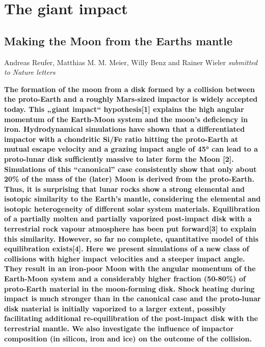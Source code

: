 \chapter{The giant impact}
\label{ch05}
\graphicspath{{./05figs/}}


\section{Making the Moon from the Earths mantle}




Andreas Reufer, Matthias M. M. Meier, Willy Benz and Rainer Wieler
\emph{submitted to Nature letters}

\textbf{The formation of the moon from a disk formed by a collision between the proto-Earth and a roughly Mars-sized impactor is widely accepted today. This „giant impact“ hypothesis[1] explains the high angular momentum of the Earth-Moon system and the moon's deficiency in iron. Hydrodynamical simulations have shown that a differentiated impactor with a chondritic Si/Fe ratio hitting the proto-Earth at mutual escape velocity and a grazing impact angle of 45° can lead to a proto-lunar disk sufficiently massive to later form the Moon [2]. Simulations of this “canonical” case consistently show that only about 20\% of the mass of the (later) Moon is derived from the proto-Earth. Thus, it is surprising that lunar rocks show a strong elemental and isotopic similarity to the Earth's mantle, considering the elemental and isotopic heterogeneity of different solar system materials. Equilibration of a partially molten and partially vaporized post-impact disk with a terrestrial rock vapour atmosphere has been put forward[3] to explain this similarity. However, so far no complete, quantitative model of this equilibration exists[4]. Here we present simulations of a new class of collisions with higher impact velocities and a steeper impact angle. They result in an iron-poor Moon with the angular momentum of the Earth-Moon system and a considerably higher fraction (50-80\%) of proto-Earth material in the moon-forming disk. Shock heating during impact is much stronger than in the canonical case and the proto-lunar disk material is initially vaporized to a larger extent, possibly facilitating additional re-equilibration of the post-impact disk with the terrestrial mantle. We also investigate the influence of impactor composition (in silicon, iron and ice) on the outcome of the collision.}

